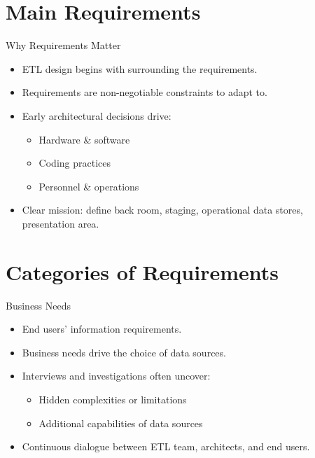 \documentclass[aspectratio=169]{beamer}
\begin{document}
\section{Main Requirements}

\begin{frame}{Why Requirements Matter}
    \begin{itemize}
        \item ETL design begins with surrounding the requirements.
        \item Requirements are non-negotiable constraints to adapt to.
        \item Early architectural decisions drive:
        \begin{itemize}
            \item Hardware \& software
            \item Coding practices
            \item Personnel \& operations
        \end{itemize}
        \item Clear mission: define back room, staging, operational data stores, presentation area.
    \end{itemize}
\end{frame}

\section{Categories of Requirements}

\begin{frame}{Business Needs}
    \begin{itemize}
        \item End users’ information requirements.
        \item Business needs drive the choice of data sources.
        \item Interviews and investigations often uncover:
        \begin{itemize}
            \item Hidden complexities or limitations
            \item Additional capabilities of data sources
        \end{itemize}
        \item Continuous dialogue between ETL team, architects, and end users.
    \end{itemize}
\end{frame}
\end{document}
